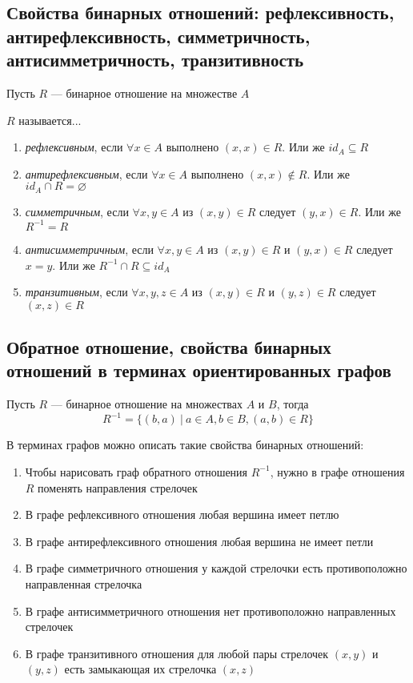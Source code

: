 \documentclass[a4paper]{article}
\begin{document}
\subsection{Свойства бинарных отношений: рефлексивность, антирефлексивность, симметричность, антисимметричность, транзитивность}
Пусть $R$ — бинарное отношение на множестве $A$

$R$ называется...
\begin{enumerate}
    \item \textit{рефлексивным}, если $\forall x\in A$ выполнено $(x, x)\in R$. Или же $id_A\subseteq R$
    \item \textit{антирефлексивным}, если $\forall x\in A$ выполнено $(x, x)\notin R$. Или же $id_A\cap R=\varnothing$
    \item \textit{симметричным}, если $\forall x, y\in A$ из $(x,y)\in R$ следует $(y, x)\in R$. Или же $R^{-1}=R$
    \item \textit{антисимметричным}, если $\forall x, y\in A$ из $(x,y)\in R$  и $(y,x)\in R$ следует $x=y$. Или же $R^{-1}\cap R\subseteq id_A$
    \item \textit{транзитивным}, если $\forall x, y, z\in A$ из $(x,y)\in R$  и $(y,z)\in R$ следует $(x, z)\in R$
\end{enumerate}

\subsection{Обратное отношение, свойства бинарных отношений в терминах ориентированных графов}
 Пусть $R$ — бинарное отношение на множествах $A$ и $B$, тогда $$R^{-1}=\{(b,a)\ |\ a\in A, b\in B, (a,b)\in R\}$$

В терминах графов можно описать такие свойства бинарных отношений:
\begin{enumerate}
    \item Чтобы нарисовать граф обратного отношения $R^{-1}$, нужно в графе отношения $R$ поменять направления стрелочек
    \item В графе рефлексивного отношения любая вершина имеет петлю
    \item В графе антирефлексивного отношения любая вершина не имеет петли
    \item В графе симметричного отношения у каждой стрелочки есть противоположно направленная стрелочка
    \item В графе антисимметричного отношения нет противоположно направленных стрелочек
    \item В графе транзитивного отношения для любой пары стрелочек $(x,y)$ и $(y,z)$ есть замыкающая их стрелочка $(x, z)$   
\end{enumerate}
\end{document}
